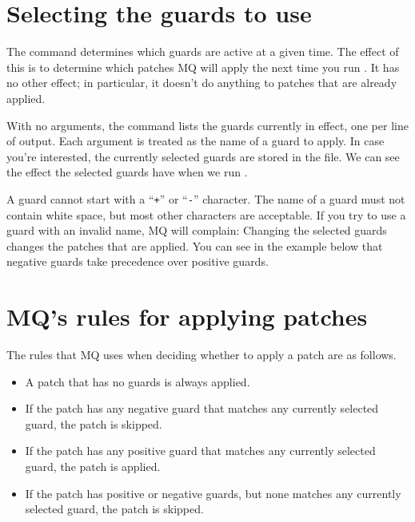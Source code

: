 \section{Selecting the guards to use}

The  command determines which guards are active at a
given time.  The effect of this is to determine which patches MQ will
apply the next time you run .  It has no other effect; in
particular, it doesn't do anything to patches that are already
applied.

With no arguments, the  command lists the guards
currently in effect, one per line of output.  Each argument is treated
as the name of a guard to apply.
In case you're interested, the currently selected guards are stored in
the  file.
We can see the effect the selected guards have when we run
.

A guard cannot start with a ``\texttt{+}'' or ``\texttt{-}''
character.  The name of a guard must not contain white space, but most
other characters are acceptable.  If you try to use a guard with an
invalid name, MQ will complain:
Changing the selected guards changes the patches that are applied.
You can see in the example below that negative guards take precedence
over positive guards.

\section{MQ's rules for applying patches}

The rules that MQ uses when deciding whether to apply a patch
are as follows.
\begin{itemize}
\item A patch that has no guards is always applied.
\item If the patch has any negative guard that matches any currently
  selected guard, the patch is skipped.
\item If the patch has any positive guard that matches any currently
  selected guard, the patch is applied.
\item If the patch has positive or negative guards, but none matches
  any currently selected guard, the patch is skipped.
\end{itemize}

